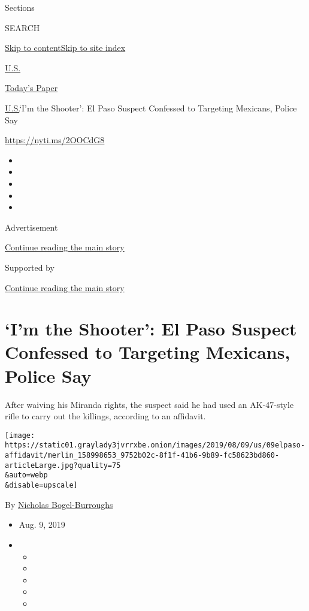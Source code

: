Sections

SEARCH

\protect\hyperlink{site-content}{Skip to
content}\protect\hyperlink{site-index}{Skip to site index}

\href{https://www.nytimes3xbfgragh.onion/section/us}{U.S.}

\href{https://myaccount.nytimes3xbfgragh.onion/auth/login?response_type=cookie\&client_id=vi}{}

\href{https://www.nytimes3xbfgragh.onion/section/todayspaper}{Today's
Paper}

\href{/section/us}{U.S.}\textbar{}`I'm the Shooter': El Paso Suspect
Confessed to Targeting Mexicans, Police Say

\url{https://nyti.ms/2OOCdG8}

\begin{itemize}
\item
\item
\item
\item
\item
\end{itemize}

Advertisement

\protect\hyperlink{after-top}{Continue reading the main story}

Supported by

\protect\hyperlink{after-sponsor}{Continue reading the main story}

\hypertarget{im-the-shooter-el-paso-suspect-confessed-to-targeting-mexicans-police-say}{%
\section{`I'm the Shooter': El Paso Suspect Confessed to Targeting
Mexicans, Police
Say}\label{im-the-shooter-el-paso-suspect-confessed-to-targeting-mexicans-police-say}}

After waiving his Miranda rights, the suspect said he had used an
AK-47-style rifle to carry out the killings, according to an affidavit.

\texttt{[image: https://static01.graylady3jvrrxbe.onion/images/2019/08/09/us/09elpaso-affidavit/merlin\_158998653\_9752b02c-8f1f-41b6-9b89-fc58623bd860-articleLarge.jpg?quality=75\\\&auto=webp\\\&disable=upscale]}

By
\href{https://www.nytimes3xbfgragh.onion/by/nicholas-bogel-burroughs}{Nicholas
Bogel-Burroughs}

\begin{itemize}
\item
  Aug. 9, 2019
\item
  \begin{itemize}
  \item
  \item
  \item
  \item
  \item
  \end{itemize}
\end{itemize}

